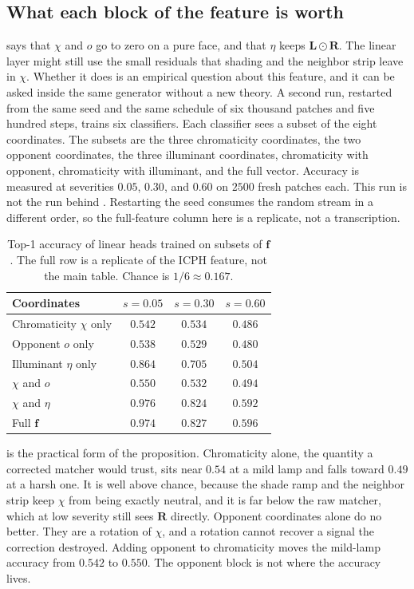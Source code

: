 \subsection{What each block of the feature is worth}
\label{sec:icph-ablation}

 says that $\chi$ and $o$ go to zero on a pure face, and that $\eta$ keeps $\mathbf{L}\odot\mathbf{R}$. The linear layer might still use the small residuals that shading and the neighbor strip leave in $\chi$. Whether it does is an empirical question about this feature, and it can be asked inside the same generator without a new theory. A second run, restarted from the same seed and the same schedule of six thousand patches and five hundred steps, trains six classifiers. Each classifier sees a subset of the eight coordinates. The subsets are the three chromaticity coordinates, the two opponent coordinates, the three illuminant coordinates, chromaticity with opponent, chromaticity with illuminant, and the full vector. Accuracy is measured at severities $0.05$, $0.30$, and $0.60$ on $2500$ fresh patches each. This run is not the run behind . Restarting the seed consumes the random stream in a different order, so the full-feature column here is a replicate, not a transcription.

\begin{table}[t]
\centering
\caption{Top-1 accuracy of linear heads trained on subsets of $\mathbf{f}$. The full row is a replicate of the ICPH feature, not the main table. Chance is $1/6\approx 0.167$.}
\label{tab:ablation}
\small
\begin{tabular}{@{}lccc@{}}
\toprule
Coordinates & $s=0.05$ & $s=0.30$ & $s=0.60$ \\
\midrule
Chromaticity $\chi$ only & $0.542$ & $0.534$ & $0.486$ \\
Opponent $o$ only & $0.538$ & $0.529$ & $0.480$ \\
Illuminant $\eta$ only & $0.864$ & $0.705$ & $0.504$ \\
$\chi$ and $o$ & $0.550$ & $0.532$ & $0.494$ \\
$\chi$ and $\eta$ & $0.976$ & $0.824$ & $0.592$ \\
Full $\mathbf{f}$ & $0.974$ & $0.827$ & $0.596$ \\
\bottomrule
\end{tabular}
\end{table}

 is the practical form of the proposition. Chromaticity alone, the quantity a corrected matcher would trust, sits near $0.54$ at a mild lamp and falls toward $0.49$ at a harsh one. It is well above chance, because the shade ramp and the neighbor strip keep $\chi$ from being exactly neutral, and it is far below the raw matcher, which at low severity still sees $\mathbf{R}$ directly. Opponent coordinates alone do no better. They are a rotation of $\chi$, and a rotation cannot recover a signal the correction destroyed. Adding opponent to chromaticity moves the mild-lamp accuracy from $0.542$ to $0.550$. The opponent block is not where the accuracy lives.

